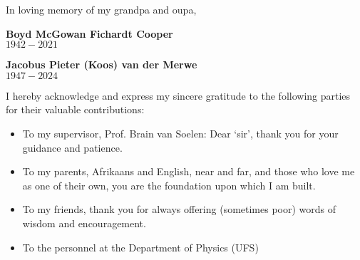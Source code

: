 \begin{dedication} \noindent


    In loving memory of my grandpa and oupa,

    \vspace{\baselineskip}

    \textbf{Boyd McGowan Fichardt Cooper} \\
    $1942 - 2021$

    \vspace{\baselineskip}

    \textbf{Jacobus Pieter (Koos) van der Merwe} \\
    $1947 - 2024$


\end{dedication}

\begin{acknowledgements}
    I hereby acknowledge and express my sincere gratitude to the following parties for their valuable contributions:
    \begin{itemize}
        \item To my supervisor, Prof. Brain van Soelen: Dear `sir', thank you for your guidance and patience.
        \item To my parents, Afrikaans and English, near and far, and those who love me as one of their own, you are the foundation upon which I am built.
        \item To my friends, thank you for always offering (sometimes poor) words of wisdom and encouragement.
        \item To the personnel at the Department of Physics (UFS)
    \end{itemize}
\end{acknowledgements}